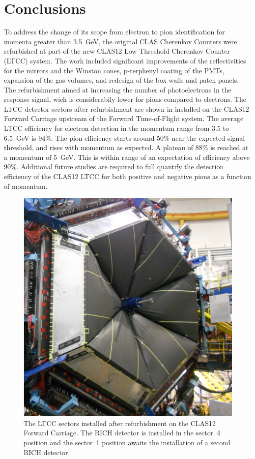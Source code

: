 \section{Conclusions}

To address the change of its scope from electron to pion identification for momenta greater than 3.5~GeV,
the original CLAS Cherenkov Counters were refurbished at part of the new CLAS12 Low Threshold Cherenkov
Counter (LTCC) system. The work included significant improvements of the reflectivities for the mirrors and the Winston
cones, p-terphenyl coating of the PMTs, expansion of the gas volumes, and redesign of the box walls and patch
panels. The refurbishment aimed at increasing the number of photoelectrons in the response signal, wich is considerabily
lower for pions compared to electrons.
The LTCC detector sectors after refurbishment are shown in  installed on the CLAS12
Forward Carriage upstream of the Forward Time-of-Flight system. The average LTCC efficiency for electron
detection in the momentum range from 3.5 to 6.5~GeV is 94\%. The pion efficiency starts around 50\% near
the expected signal threshold, and rises with momentum as expected. A plateau of 88\% is reached at a momentum
of 5~GeV. This is within range of an expectation of efficiency above 90\%. Additional future studies are required
to full quantify the detection efficiency of the CLAS12 LTCC for both positive and negative pions as a function of
momentum.

\begin{figure}
    \centering
    \includegraphics[width=1.0\columnwidth, height=1.1\columnwidth]{img/ltccInstalled.png}
    \caption{The LTCC sectors installed after refurbishment on the CLAS12 Forward Carriage. The RICH detector
    is installed in the sector~4 position and the sector~1 position awaits the installation of a second RICH detector.}
    \label{fig:ltccInstalled}
\end{figure}

